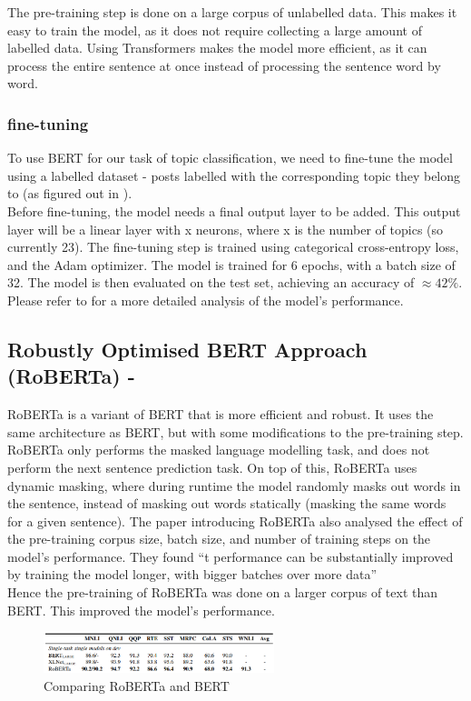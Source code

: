 The pre-training step is done on a large corpus of unlabelled data. This makes it easy to train the model, as it does not require
collecting a large amount of labelled data. Using Transformers makes the model more efficient, as it can process the entire sentence
at once instead of processing the sentence word by word.

\subsubsection{fine-tuning}
To use BERT for our task of topic classification, we need to fine-tune the model using a labelled dataset - posts labelled with the
corresponding topic they belong to (as figured out in ).\\
Before fine-tuning, the model needs a final output layer to be added. This output layer will be a linear layer with x neurons, where
x is the number of topics (so currently 23). The fine-tuning step is trained using categorical cross-entropy loss, and the Adam optimizer.
The model is trained for 6 epochs, with a batch size of 32. The model is then evaluated on the test set, achieving an accuracy
of $\approx 42\%$. Please refer to for a more detailed analysis of the model's performance.

\subsection{Robustly Optimised BERT Approach (RoBERTa) - \cite{DBLP:journals/corr/abs-1907-11692}}
RoBERTa is a variant of BERT that is more efficient and robust. It uses the same architecture as BERT, but with some modifications to 
the pre-training step. RoBERTa only performs the masked language modelling task, and does not perform the next sentence prediction task.
On top of this, RoBERTa uses dynamic masking, where during runtime the model randomly masks out words in the sentence, instead of
masking out words statically (masking the same words for a given sentence). The paper introducing RoBERTa also analysed the effect
of the pre-training corpus size, batch size, and number of training steps on the model's performance. They found ``t performance can be substantially
improved by training the model longer, with bigger batches over more data'' \cite{DBLP:journals/corr/abs-1907-11692}\\
Hence the pre-training of RoBERTa was done on a larger corpus of text than BERT. This improved the model's performance.
\begin{figure}
    \centering
    \includegraphics[width=0.6\textwidth]{../images/roberta-tasks.png}
    \caption{Comparing RoBERTa and BERT \cite{DBLP:journals/corr/abs-1907-11692}}
    \label{fig:bertcomproberta}
\end{figure}

